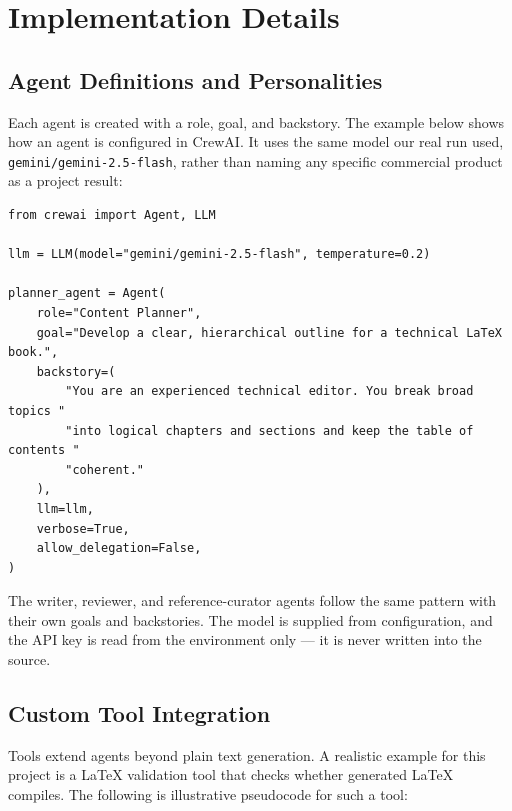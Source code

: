 
\chapter{Implementation Details}

\section{Agent Definitions and Personalities}

Each agent is created with a role, goal, and backstory. The example below
shows how an agent is configured in CrewAI. It uses the same model our real
run used, \texttt{gemini/gemini-2.5-flash}, rather than naming any specific
commercial product as a project result:

\begin{verbatim}
from crewai import Agent, LLM

llm = LLM(model="gemini/gemini-2.5-flash", temperature=0.2)

planner_agent = Agent(
    role="Content Planner",
    goal="Develop a clear, hierarchical outline for a technical LaTeX book.",
    backstory=(
        "You are an experienced technical editor. You break broad topics "
        "into logical chapters and sections and keep the table of contents "
        "coherent."
    ),
    llm=llm,
    verbose=True,
    allow_delegation=False,
)
\end{verbatim}

The writer, reviewer, and reference-curator agents follow the same pattern
with their own goals and backstories. The model is supplied from
configuration, and the API key is read from the environment only --- it is
never written into the source.

\section{Custom Tool Integration}

Tools extend agents beyond plain text generation. A realistic example for
this project is a \LaTeX{} validation tool that checks whether generated
\LaTeX{} compiles. The following is illustrative pseudocode for such a tool:

